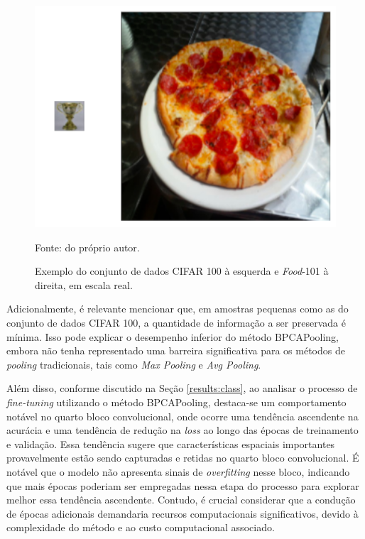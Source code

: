\begin{figure}[H]
    \centering
    \caption{Exemplo do conjunto de dados CIFAR 100 à esquerda e \textit{Food}-101 à direita, em escala real.}
    \label{results:fig:datasets:0}
    \includegraphics[width=1\textwidth]{recursos/imagens/results/dataset_diff.png}

    Fonte: do próprio autor.
\end{figure}

Adicionalmente, é relevante mencionar que, em amostras pequenas como as do conjunto de dados CIFAR 100, a quantidade de informação a ser preservada é mínima. Isso pode explicar o desempenho inferior do método BPCAPooling, embora não tenha representado uma barreira significativa para os métodos de \textit{pooling} tradicionais, tais como \textit{Max Pooling} e \textit{Avg Pooling}.

Além disso, conforme discutido na Seção \ref{results:class}, ao analisar o processo de \textit{fine-tuning} utilizando o método BPCAPooling, destaca-se um comportamento notável no quarto bloco convolucional, onde ocorre uma tendência ascendente na acurácia e uma tendência de redução na \textit{loss} ao longo das épocas de treinamento e validação. Essa tendência sugere que características espaciais importantes provavelmente estão sendo capturadas e retidas no quarto bloco convolucional. É notável que o modelo não apresenta sinais de \textit{overfitting} nesse bloco, indicando que mais épocas poderiam ser empregadas nessa etapa do processo para explorar melhor essa tendência ascendente. Contudo, é crucial considerar que a condução de épocas adicionais demandaria recursos computacionais significativos, devido à complexidade do método e ao custo computacional associado.

